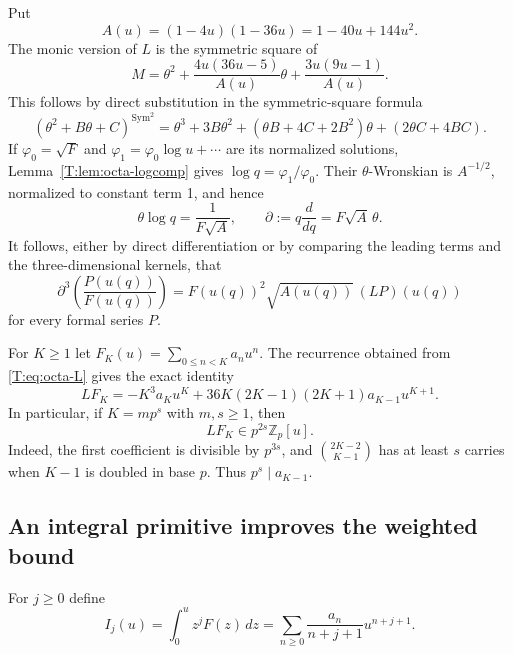 \documentclass[11pt,a4paper]{article}
\theoremstyle{definition}\newtheorem{definition}[theorem]{Definition}
\theoremstyle{remark}\newtheorem{remark}[theorem]{Remark}
\numberwithin{equation}{section}
\begin{document}
Put
\[
 A(u)=(1-4u)(1-36u)=1-40u+144u^2.
\]
The monic version of $L$ is the symmetric square of
\[
 M=\theta^2+
     \frac{4u(36u-5)}{A(u)}\theta+
     \frac{3u(9u-1)}{A(u)}.
\]
This follows by direct substitution in the symmetric-square formula
\[
 (\theta^2+B\theta+C)^{\operatorname{Sym}^2}
 =\theta^3+3B\theta^2+(\theta B+4C+2B^2)\theta
                       +(2\theta C+4BC).
\]
If $\varphi_0=\sqrt F$ and
$\varphi_1=\varphi_0\log u+\cdots$ are its normalized solutions,
Lemma~\ref{T:lem:octa-logcomp} gives
$\log q=\varphi_1/\varphi_0$.
Their $\theta$-Wronskian is $A^{-1/2}$, normalized to constant term 1,
and hence
\begin{equation}\label{T:eq:octa-q-derivative}
 \theta\log q=\frac{1}{F\sqrt A},\qquad
 \partial:=q\frac{d}{dq}=F\sqrt A\,\theta.
\end{equation}
It follows, either by direct differentiation or by comparing the
leading terms and the three-dimensional kernels, that
\begin{equation}\label{T:eq:octa-Bol}
 \partial^3\left(\frac{P(u(q))}{F(u(q))}\right)
       =F(u(q))^2\sqrt{A(u(q))}\,(LP)(u(q))
\end{equation}
for every formal series $P$.

For $K\geq1$ let $F_K(u)=\sum_{0\leq n<K}a_nu^n$.
The recurrence obtained from \eqref{T:eq:octa-L} gives the exact identity
\begin{equation}\label{T:eq:octa-truncated-residual}
 LF_K=-K^3a_Ku^K
       +36K(2K-1)(2K+1)a_{K-1}u^{K+1}.
\end{equation}
In particular, if $K=mp^s$ with $m,s\geq1$, then
\[
 LF_K\in p^{2s}\mathbb Z_p[u].
\]
Indeed, the first coefficient is divisible by $p^{3s}$, and
$\binom{2K-2}{K-1}$ has at least $s$ carries when $K-1$ is doubled
in base $p$.  Thus $p^s\mid a_{K-1}$.

\subsection{An integral primitive improves the weighted bound}

For $j\geq0$ define
\[
 I_j(u)=\int_0^u z^jF(z)\,dz
       =\sum_{n\geq0}\frac{a_n}{n+j+1}u^{n+j+1}.
\]
\end{document}
